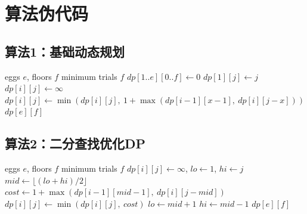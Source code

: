 \documentclass[12pt,a4paper]{article}
\begin{document}

\section*{算法伪代码}

\subsection*{算法1：基础动态规划}
\begin{algorithm}[H]
\caption{Basic DP: $O(e \cdot f^2)$ time, $O(e \cdot f)$ space}
\begin{algorithmic}[1]
\REQUIRE eggs $e$, floors $f$
\ENSURE minimum trials
  \ENDIF
{} \RETURN $f$ \ENDIF
\STATE $dp[1..e][0..f] \leftarrow 0$
    \STATE $dp[1][j] \leftarrow j$
\ENDFOR
{}
        \STATE $dp[i][j] \leftarrow \infty$
            \STATE $dp[i][j] \leftarrow \min(dp[i][j],\ 1 + \max(dp[i-1][x-1],\ dp[i][j-x]))$
        \ENDFOR
    \ENDFOR
\ENDFOR
\RETURN $dp[e][f]$
\end{algorithmic}
\end{algorithm}

\subsection*{算法2：二分查找优化DP}
\begin{algorithm}[H]
\caption{Binary Search DP: $O(e \cdot f \cdot \log f)$ time, $O(e \cdot f)$ space}
\begin{algorithmic}[1]
\REQUIRE eggs $e$, floors $f$
\ENSURE minimum trials
  \ENDIF
{} \RETURN $f$ \ENDIF
{}
        \STATE $dp[i][j] \leftarrow \infty$, $lo \leftarrow 1$, $hi \leftarrow j$
            \STATE $mid \leftarrow \lfloor(lo + hi) / 2\rfloor$
            \STATE $cost \leftarrow 1 + \max(dp[i-1][mid-1],\ dp[i][j-mid])$
            \STATE $dp[i][j] \leftarrow \min(dp[i][j],\ cost)$
                \STATE $lo \leftarrow mid + 1$
            \ELSE
                \STATE $hi \leftarrow mid - 1$
            \ENDIF
        \ENDWHILE
    \ENDFOR
\ENDFOR
\RETURN $dp[e][f]$
\end{algorithmic}
\end{algorithm}
\end{document}
